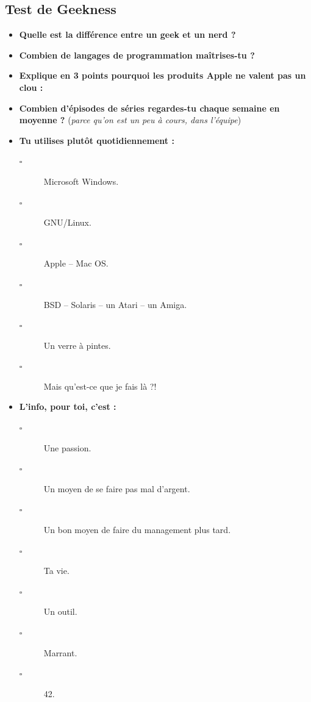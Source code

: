 \subsection*{Test de Geekness}
\begin{itemize}

    \item \textbf{Quelle est la différence entre un geek et un nerd ?}
    \vspace{5cm}
	
    \item \textbf{Combien de langages de programmation maîtrises-tu ?}
    \vspace{4cm}
	
    \item \textbf{Explique en 3 points pourquoi les produits Apple ne valent
	pas un clou :}
    \vspace{4cm}

    \newpage

    \item \textbf{Combien d'épisodes de séries regardes-tu chaque
	semaine en moyenne ?} (\emph{parce qu'on est un peu à cours, dans l'équipe})
    \vspace{5cm}
    
    \item \textbf{Tu utilises plutôt quotidiennement :}
    \begin{description}
	\item[$\square$] Microsoft Windows.
	\item[$\square$] GNU/Linux.
	\item[$\square$] Apple -- Mac OS.
	\item[$\square$] BSD -- Solaris -- un Atari -- un Amiga.
	\item[$\square$] Un verre à pintes.
	\item[$\square$] Mais qu'est-ce que je fais là ?!
    \end{description}
	\vspace{2em}
	
    \item \textbf{L'info, pour toi, c'est :}
    \begin{description}
	\item[$\square$] Une passion.
	\item[$\square$] Un moyen de se faire pas mal d'argent.
	\item[$\square$] Un bon moyen de faire du management plus tard.
	\item[$\square$] Ta vie.
	\item[$\square$] Un outil.
	\item[$\square$] Marrant.
	\item[$\square$] 42.
    \end{description}
	\vspace{2em}
	

\end{itemize}
